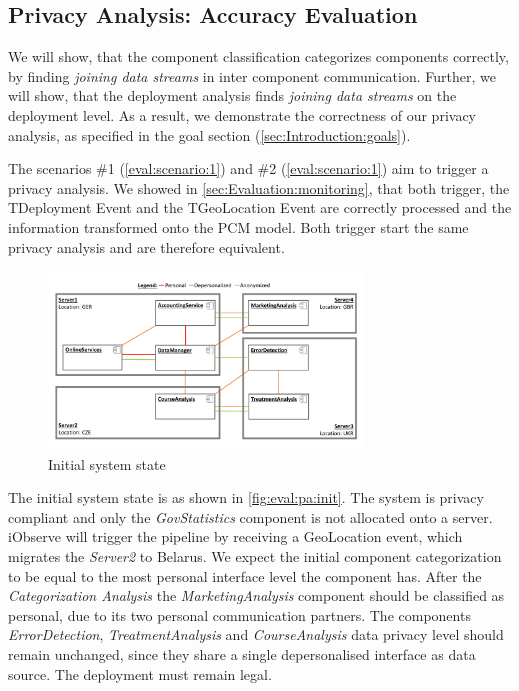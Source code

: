 \subsection{Privacy Analysis: Accuracy Evaluation}

We will show, that the component classification categorizes components correctly, by finding \textit{joining data streams} in inter component communication. Further, we will show, that the deployment analysis finds \textit{joining data streams} on the deployment level. As a result, we demonstrate the correctness of our privacy analysis, as specified in the goal section (\autoref{sec:Introduction:goals}).

The scenarios \#1 (\autoref{eval:scenario:1}) and \#2 (\autoref{eval:scenario:1}) aim to trigger a privacy analysis. We showed in \autoref{sec:Evaluation:monitoring}, that both trigger, the TDeployment Event and the TGeoLocation Event are correctly processed and the information transformed onto the PCM model. Both trigger start the same privacy analysis and are therefore equivalent. 

\begin{figure}[h]
	\centering
	\includegraphics[trim = 0mm 10mm 0mm 10mm, clip, width=0.75\textwidth]{graphs/medSys_eval_pa_init}
	\caption{Initial system state}
	\label{fig:eval:pa:init}
\end{figure}

The initial system state is as shown in \autoref{fig:eval:pa:init}. The system is privacy compliant and only the \textit{GovStatistics} component is not allocated onto a server. iObserve will trigger the pipeline by receiving a GeoLocation event, which migrates the \textit{Server2} to Belarus. We expect the initial component categorization to be equal to the most personal interface level the component has. After the \textit{Categorization Analysis} the \textit{MarketingAnalysis} component should be classified as personal, due to its two personal communication partners. The components \textit{ErrorDetection}, \textit{TreatmentAnalysis} and \textit{CourseAnalysis} data privacy level should remain unchanged, since they share a single depersonalised interface as data source. The deployment must remain legal.

